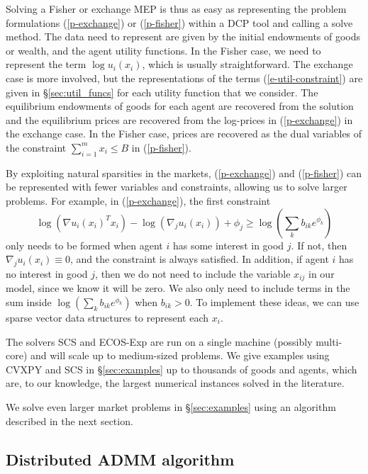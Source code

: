 \documentclass[12pt]{article}
\begin{document}
Solving a Fisher or exchange MEP is thus as easy as representing the problem
formulations (\ref{p-exchange}) or (\ref{p-fisher}) within a DCP tool and
calling a solve method. The data need to represent are given by the initial
endowments of goods or wealth, and the agent utility functions. In the Fisher
case, we need to represent the term $\log u_i(x_i)$, which is usually
straightforward. The exchange case is more involved, but the representations of
the terms (\ref{e-util-constraint}) are given in \S\ref{sec:util_funcs} for
each utility function that we consider. The equilibrium endowments of goods for
each agent are recovered from the solution and the equilibrium prices are recovered
from the log-prices in (\ref{p-exchange}) in the exchange case. In the Fisher
case, prices are recovered as the dual variables of the constraint $\sum_{i=1}^m
x_i \leq B$ in (\ref{p-fisher}).

By exploiting natural sparsities in the markets,
(\ref{p-exchange}) and (\ref{p-fisher}) can be represented with fewer variables
and constraints, allowing us to solve larger problems. For example,
in (\ref{p-exchange}), the first constraint 
\[
\log(\nabla u_i(x_i)^T x_i) - \log(\nabla_j u_i(x_i)) + \phi_j 
\geq \log(\sum_k b_{ik} e^{\phi_k})
\]
only needs to be formed when agent $i$ has some interest in good $j$.
If not, then $\nabla_j u_i(x_i) \equiv 0$, and the constraint is always satisfied.
In addition, if agent $i$ has no interest in good $j$, then we do not
need to include the variable $x_{ij}$ in our model, since we know it will
be zero. We also only need to include terms in the sum inside
$\log(\sum_k b_{ik} e^{\phi_k})$ when $b_{ik} > 0$. To implement these ideas,
we can use sparse vector data structures to represent each $x_i$.

The solvers SCS and ECOS-Exp are run on a single machine (possibly multi-core)
and will scale up to medium-sized problems. We give examples 
using CVXPY and SCS in \S\ref{sec:examples}
up to thousands of goods and agents, which are, to our knowledge,
the largest numerical instances solved in the literature.

We solve even larger market problems in \S\ref{sec:examples}
using an algorithm described in the next section.


\subsection{Distributed ADMM algorithm}
\label{sec:distributed}
\end{document}
